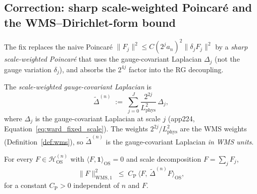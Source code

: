 \subsection{Correction: sharp scale-weighted Poincar\'e and the
WMS--Dirichlet-form bound}
\label{ssec:corrected_ward}

The fix replaces the naive Poincar\'e
$\|F_{j}\|^{2}\le C(2^{j}a_{n})^{2}\|\delta_{j}F_{j}\|^{2}$ by a
\emph{sharp scale-weighted Poincar\'e} that uses the
gauge-covariant Laplacian $\Delta_{j}$ (not the gauge variation
$\delta_{j}$), and absorbs the $2^{4j}$ factor into the
RG decoupling.

\begin{definition}
\label{def:sw_laplacian}
The \emph{scale-weighted gauge-covariant Laplacian} is
\begin{equation}
\label{eq:sw_laplacian}
  \widetilde{\Delta}^{(n)}
  \;:=\;\sum_{j=0}^{J}\frac{2^{2j}}{L_{\mathrm{phys}}^{2}}\,
  \Delta_{j},
\end{equation}
where $\Delta_{j}$ is the gauge-covariant Laplacian at scale $j$
(app224, Equation~\eqref{eq:ward_fixed_scale}). The weights
$2^{2j}/L_{\mathrm{phys}}^{2}$ are the WMS weights
(Definition~\ref{def:wms}), so $\widetilde{\Delta}^{(n)}$ is the
gauge-covariant Laplacian \emph{in WMS units}.
\end{definition}

\begin{theorem}
\label{thm:sharp_poincare}
For every $F\in\mathcal{H}_{\mathrm{OS}}^{(n)}$ with
$\langle F,\mathbf{1}\rangle_{\mathrm{OS}}=0$ and scale
decomposition $F=\sum_{j}F_{j}$,
\begin{equation}
\label{eq:sharp_poincare}
  \|F\|_{\mathrm{WMS},1}^{2}
  \;\le\;C_{\mathrm{P}}\,
  \langle F,\,\widetilde{\Delta}^{(n)}F\rangle_{\mathrm{OS}},
\end{equation}
for a constant $C_{\mathrm{P}}>0$ independent of $n$ and $F$.
\end{theorem}


